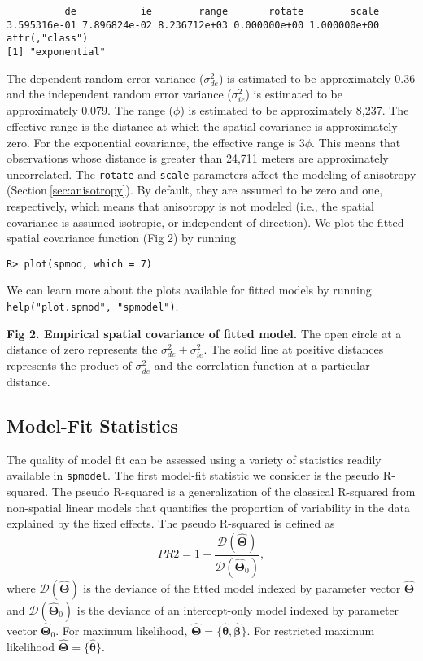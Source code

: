 \documentclass[10pt,letterpaper]{article}
\begin{document}
\begin{verbatim}
          de           ie        range       rotate        scale 
3.595316e-01 7.896824e-02 8.236712e+03 0.000000e+00 1.000000e+00 
attr(,"class")
[1] "exponential"
\end{verbatim}

The dependent random error variance (\(\sigma^2_{de}\)) is estimated to
be approximately 0.36 and the independent random error variance
(\(\sigma^2_{ie}\)) is estimated to be approximately 0.079. The range
(\(\phi\)) is estimated to be approximately 8,237. The effective range
is the distance at which the spatial covariance is approximately zero.
For the exponential covariance, the effective range is \(3\phi\). This
means that observations whose distance is greater than 24,711 meters are
approximately uncorrelated. The \texttt{rotate} and \texttt{scale}
parameters affect the modeling of anisotropy
(Section\(~\)\ref{sec:anisotropy}). By default, they are assumed to be
zero and one, respectively, which means that anisotropy is not modeled
(i.e., the spatial covariance is assumed isotropic, or independent of
direction). We plot the fitted spatial covariance function (Fig 2) by
running

\begin{verbatim}
R> plot(spmod, which = 7)
\end{verbatim}

We can learn more about the plots available for fitted models by running
\texttt{help("plot.spmod",\ "spmodel")}.

\textbf{Fig 2. Empirical spatial covariance of fitted model.} The open
circle at a distance of zero represents the
\(\sigma^2_{de} + \sigma^2_{ie}\). The solid line at positive distances
represents the product of \(\sigma^2_{de}\) and the correlation function
at a particular distance.

\hypertarget{model-fit-statistics}{%
\subsection{Model-Fit Statistics}\label{model-fit-statistics}}

The quality of model fit can be assessed using a variety of statistics
readily available in \texttt{spmodel}. The first model-fit statistic we
consider is the pseudo R-squared. The pseudo R-squared is a
generalization of the classical R-squared from non-spatial linear models
that quantifies the proportion of variability in the data explained by
the fixed effects. The pseudo R-squared is defined as \begin{equation*}
PR2 = 1 - \frac{\mathcal{D}(\boldsymbol{\hat{\Theta}})}{\mathcal{D}(\boldsymbol{\hat{\Theta}}_0)},
\end{equation*} where \(\mathcal{D}(\boldsymbol{\hat{\Theta}})\) is the
deviance of the fitted model indexed by parameter vector
\(\boldsymbol{\hat{\Theta}}\) and
\(\mathcal{D}(\boldsymbol{\hat{\Theta}}_0)\) is the deviance of an
intercept-only model indexed by parameter vector
\(\boldsymbol{\hat{\Theta}}_0\). For maximum likelihood,
\(\hat{\boldsymbol{\Theta}} = \{\hat{\boldsymbol{\theta}}, \hat{\boldsymbol{\beta}}\}\).
For restricted maximum likelihood
\(\hat{\boldsymbol{\Theta}} = \{\hat{\boldsymbol{\theta}}\}\).
\end{document}
